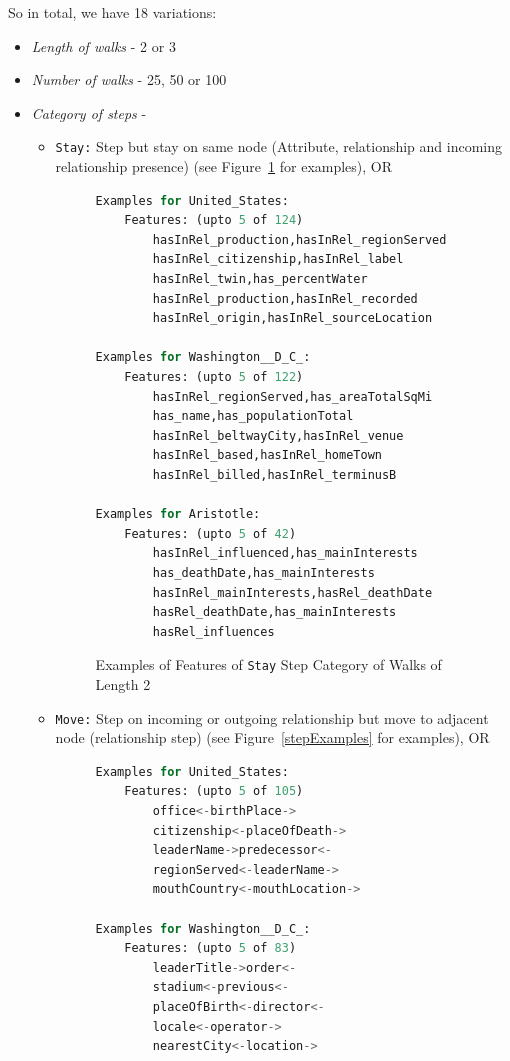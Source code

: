 \documentclass[runningheads,a4paper]{IEEEtran}
\begin{document}
So in total, we have 18 variations:
\begin{itemize}
\item \textit{Length of walks} - 2 or 3
\item \textit{Number of walks} - 25, 50 or 100
\item \textit{Category of steps} - 
   \begin{itemize}
   \item \texttt{Stay:} Step but stay on same node (Attribute, relationship and incoming relationship presence) (see Figure~\ref{all3Examples} for examples), OR
\begin{figure}[t]
\begin{lstlisting}[language=Python,basicstyle=\tiny, frame=single]
Examples for United_States: 
	Features: (upto 5 of 124)
		hasInRel_production,hasInRel_regionServed
		hasInRel_citizenship,hasInRel_label
		hasInRel_twin,has_percentWater
		hasInRel_production,hasInRel_recorded
		hasInRel_origin,hasInRel_sourceLocation

Examples for Washington__D_C_: 
	Features: (upto 5 of 122)
		hasInRel_regionServed,has_areaTotalSqMi
		has_name,has_populationTotal
		hasInRel_beltwayCity,hasInRel_venue
		hasInRel_based,hasInRel_homeTown
		hasInRel_billed,hasInRel_terminusB

Examples for Aristotle: 
	Features: (upto 5 of 42)
		hasInRel_influenced,has_mainInterests
		has_deathDate,has_mainInterests
		hasInRel_mainInterests,hasRel_deathDate
		hasRel_deathDate,has_mainInterests
		hasRel_influences
\end{lstlisting}
\caption{Examples of Features of \texttt{Stay} Step Category of Walks of Length 2}
\label{all3Examples}
\end{figure} 
   \item \texttt{Move:} Step on incoming or outgoing relationship but move to adjacent node (relationship step) (see Figure~\ref{stepExamples} for examples), OR
\begin{figure}[t]
\begin{lstlisting}[language=Python,basicstyle=\tiny, frame=single]
Examples for United_States: 
	Features: (upto 5 of 105)
		office<-birthPlace->
		citizenship<-placeOfDeath->
		leaderName->predecessor<-
		regionServed<-leaderName->
		mouthCountry<-mouthLocation->

Examples for Washington__D_C_: 
	Features: (upto 5 of 83)
		leaderTitle->order<-
		stadium<-previous<-
		placeOfBirth<-director<-
		locale<-operator->
		nearestCity<-location->


\end{lstlisting}
\end{figure}
\end{itemize}
\end{itemize}
\end{document}
